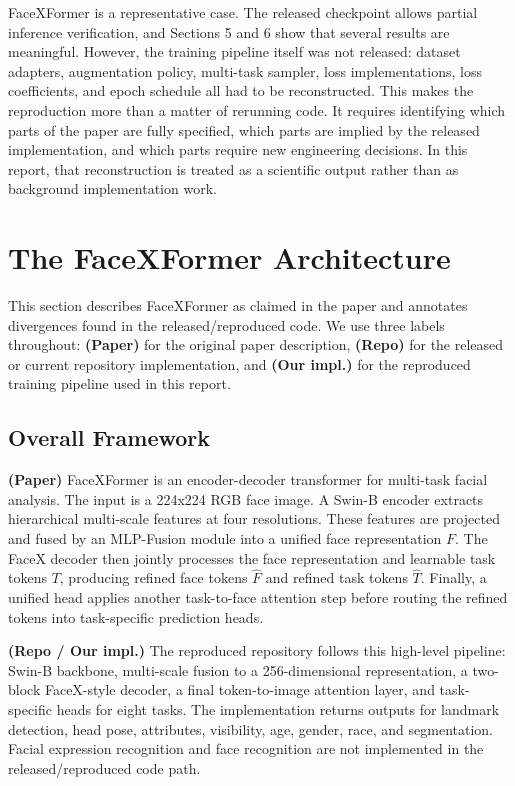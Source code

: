 \documentclass[11pt]{article}
\begin{document}
FaceXFormer is a representative case. The released checkpoint allows partial inference verification, and Sections 5 and 6 show that several results are meaningful. However, the training pipeline itself was not released: dataset adapters, augmentation policy, multi-task sampler, loss implementations, loss coefficients, and epoch schedule all had to be reconstructed. This makes the reproduction more than a matter of rerunning code. It requires identifying which parts of the paper are fully specified, which parts are implied by the released implementation, and which parts require new engineering decisions. In this report, that reconstruction is treated as a scientific output rather than as background implementation work.


\section{The FaceXFormer Architecture}


This section describes FaceXFormer as claimed in the paper and annotates divergences found in the released/reproduced code. We use three labels throughout: \textbf{(Paper)} for the original paper description, \textbf{(Repo)} for the released or current repository implementation, and \textbf{(Our impl.)} for the reproduced training pipeline used in this report.


\subsection{Overall Framework}


\textbf{(Paper)} FaceXFormer is an encoder-decoder transformer for multi-task facial analysis. The input is a 224x224 RGB face image. A Swin-B encoder extracts hierarchical multi-scale features at four resolutions. These features are projected and fused by an MLP-Fusion module into a unified face representation \(F\). The FaceX decoder then jointly processes the face representation and learnable task tokens \(T\), producing refined face tokens \(\hat{F}\) and refined task tokens \(\hat{T}\). Finally, a unified head applies another task-to-face attention step before routing the refined tokens into task-specific prediction heads.


\textbf{(Repo / Our impl.)} The reproduced repository follows this high-level pipeline: Swin-B backbone, multi-scale fusion to a 256-dimensional representation, a two-block FaceX-style decoder, a final token-to-image attention layer, and task-specific heads for eight tasks. The implementation returns outputs for landmark detection, head pose, attributes, visibility, age, gender, race, and segmentation. Facial expression recognition and face recognition are not implemented in the released/reproduced code path.
\end{document}
